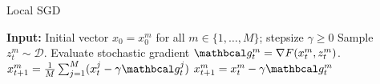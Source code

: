 \begin{algorithm} \label{alg:localsgd}
    \caption{Local SGD}
    \begin{algorithmic}[1]
        \State \textbf{Input:} 
        Initial vector $x_0 = x^m_0$ for all $m \in \{1, \ldots, M\}$; 
        stepsize $\gamma \geq 0$
                \State Sample $z^m_t \sim \mathcal{D}$.
                \State Evaluate stochastic gradient $\mc{g}_t^m = \nabla F(x_t^m, z^m_t)$.
            \EndFor
                \State $x^m_{t+1} = \frac{1}{M} \sum^M_{j = 1} (x^j_t - \gamma \mc{g}^j_t) $
            \Else
                \State $x^m_{t+1} = x_t^m - \gamma \mc{g}_t^m$ \label{eq:upd_eq}
            \EndIf
        \EndFor
    \end{algorithmic}
\end{algorithm}